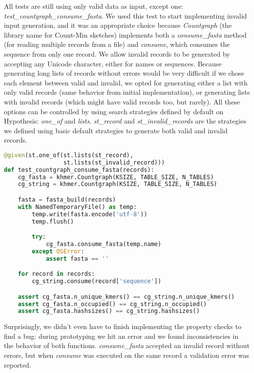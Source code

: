\documentclass[preprint,nocopyrightspace]{sig-alternate}
\begin{document}
All tests are still using only valid data as input,
except one: \emph{test\_countgraph\_consume\_fasta}.
We used this test to start implementing invalid input generation,
and it was an appropriate choice because \emph{Countgraph} (the library name for Count-Min sketches)
implements both a \emph{consume\_fasta} method (for reading multiple records from a file) and \emph{consume},
which consumes the sequence from only one record.
We allow invalid records to be generated by accepting any Unicode character,
either for names or sequences.
Because generating long lists of records without errors would be very difficult if we chose each element between valid and invalid,
we opted for generating either a list with only valid records (same behavior from initial implementation),
or generating lists with invalid records (which might have valid records too, but rarely).
All these options can be controlled by using search strategies defined by default on Hypothesis:
\emph{one\_of} and \emph{lists}.
\emph{st\_record} and \emph{st\_invalid\_records} are the strategies we defined using basic default strategies to generate both valid and invalid records.

\begin{lstlisting}[language=Python,basicstyle=\tiny\tt,caption={Countgraph sequence consumption test},label={CountgraphTest}]
@given(st.one_of(st.lists(st_record),
                 st.lists(st_invalid_record)))
def test_countgraph_consume_fasta(records):
    cg_fasta = khmer.Countgraph(KSIZE, TABLE_SIZE, N_TABLES)
    cg_string = khmer.Countgraph(KSIZE, TABLE_SIZE, N_TABLES)

    fasta = fasta_build(records)
    with NamedTemporaryFile() as temp:
        temp.write(fasta.encode('utf-8'))
        temp.flush()

        try:
            cg_fasta.consume_fasta(temp.name)
        except OSError:
            assert fasta == ''

    for record in records:
        cg_string.consume(record['sequence'])

    assert cg_fasta.n_unique_kmers() == cg_string.n_unique_kmers()
    assert cg_fasta.n_occupied() == cg_string.n_occupied()
    assert cg_fasta.hashsizes() == cg_string.hashsizes()
\end{lstlisting}

Surprisingly,
we didn't even have to finish implementing the property checks to find a bug:
during prototyping we hit an error and we found inconsistencies in the behavior of both functions.
\emph{consume\_fasta} accepted an invalid record without errors,
but when \emph{consume} was executed on the same record a validation error was reported.
\end{document}
